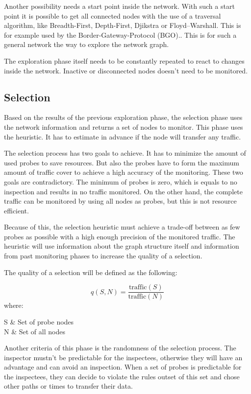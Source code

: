 \documentclass[thesis.tex]{subfiles}
\begin{document}
Another possibility needs a start point inside the network. With such a start point it is possible to get all connected nodes with the use of a traversal algorithm, like Breadth-First, Depth-First, Djikstra or Floyd–Warshall. This is for example used by the Border-Gateway-Protocol (BGO).. This is for such a general network the way to explore the network graph.

The exploration phase itself needs to be constantly repeated to react to changes inside the network. Inactive or disconnected nodes doesn't need to be monitored.

\subsection{Selection}

Based on the results of the previous exploration phase, the selection phase uses the network information and returns a set of nodes to monitor. This phase uses the heuristic. It has to estimate in advance if the node will transfer any traffic.

The selection process has two goals to achieve. It has to minimize the amount of used probes to save resources. But also the probes have to form the maximum amount of traffic cover to achieve a high accuracy of the monitoring. These two goals are contradictory. The minimum of probes is zero, which is equals to no inspection and results in no traffic monitored. On the other hand, the complete traffic can be monitored by using all nodes as probes, but this is not resource efficient.

Because of this, the selection heuristic must achieve a trade-off between as few probes as possible with a high enough precision of the monitored traffic. The heuristic will use information about the graph structure itself and information from past monitoring phases to increase the quality of a selection.

The quality of a selection will be defined as the following:

\begin{equation} \label{equo:qualitySelection}
q(S,N) = \frac{\text{traffic}(S)}{\text{traffic}(N)}
\end{equation}
where:
\begin{conditions}
    S     &  Set of probe nodes \\
    N     &  Set of all nodes
\end{conditions}

Another criteria of this phase is the randomness of the selection process. The inspector mustn't be predictable for the inspectees, otherwise they will have an advantage and can avoid an inspection. When a set of probes is predictable for the inspectees, they can decide to violate the rules outset of this set and chose other paths or times to transfer their data. 
\end{document}
